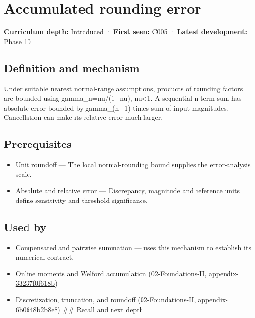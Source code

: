 \hypertarget{appendix-f82e270791c8}{}
\section{Accumulated rounding error}\label{appendix-f82e270791c8-accumulated-rounding-error}

\textbf{Curriculum depth:} Introduced · \textbf{First seen:} C005 · \textbf{Latest development:} Phase 10

\subsection{Definition and mechanism}\label{appendix-f82e270791c8-definition-and-mechanism}

Under suitable nearest normal-range assumptions, products of rounding factors are bounded using gamma\_n=nu/(1−nu), nu\textless1. A sequential n-term sum has absolute error bounded by gamma\_(n−1) times sum of input magnitudes. Cancellation can make its relative error much larger.

\subsection{Prerequisites}\label{appendix-f82e270791c8-prerequisites}

\begin{itemize}
\tightlist
\item
  \hyperref[appendix-bc44f7b42f42]{Unit roundoff} --- The local normal-rounding bound supplies the error-analysis scale.
\item
  \hyperref[appendix-3ae74e89b4e6]{Absolute and relative error} --- Discrepancy, magnitude and reference units define sensitivity and threshold significance.
\end{itemize}

\subsection{Used by}\label{appendix-f82e270791c8-used-by}

\begin{itemize}
\item
  \hyperref[appendix-df318da57389]{Compensated and pairwise summation} --- uses this mechanism to establish its numerical contract.
\item
  \href{../02-Foundations-II/main.pdf\#nameddest=appendix-33237f0f618b}{Online moments and Welford accumulation (02-Foundations-II, appendix-33237f0f618b)}
\item
  \href{../02-Foundations-II/main.pdf\#nameddest=appendix-6b0648b2b8e8}{Discretization, truncation, and roundoff (02-Foundations-II, appendix-6b0648b2b8e8)} \#\# Recall and next depth
\end{itemize}

